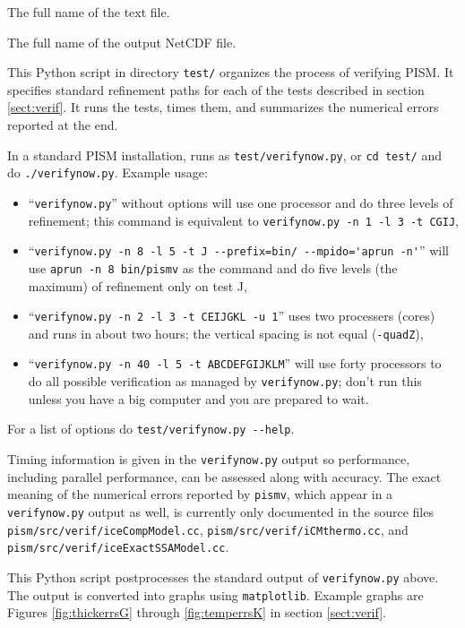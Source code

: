 \documentclass[11pt,final]{amsart}
\newcommand{\und}{\_\!\_}
\begin{document}
 The full name of the text file.

\scriptoptdef{o}{out}{series\und out.nc} The full name of the output NetCDF file.


  This Python script in directory \verb|test/| organizes the process of verifying PISM.  It specifies standard refinement paths for each of the tests described in section \ref{sect:verif}.  It runs the tests, times them, and summarizes the numerical errors reported at the end.

In a standard PISM installation, runs as \verb|test/verifynow.py|, or \verb|cd test/| and do \verb|./verifynow.py|.  Example usage: \begin{itemize}
\item ``\verb|verifynow.py|'' without options will use one processor and do three levels of refinement; this command is equivalent to \verb|verifynow.py -n 1 -l 3 -t CGIJ|,
\item ``\verb|verifynow.py -n 8 -l 5 -t J --prefix=bin/ --mpido='aprun -n'|'' will use \verb|aprun -n 8 bin/pismv| as the command and do five levels (the maximum) of refinement only on test J,
\item ``\verb|verifynow.py -n 2 -l 3 -t CEIJGKL -u 1|'' uses two processers (cores) and runs in about two hours; the vertical spacing is not equal (\verb|-quadZ|),
\item ``\verb|verifynow.py -n 40 -l 5 -t ABCDEFGIJKLM|'' will use forty processors to do all possible verification as managed by \verb|verifynow.py|; don't run this unless you have a big computer and you are prepared to wait.
\end{itemize}

For a list of options do \verb|test/verifynow.py --help|.

Timing information is given in the \verb|verifynow.py| output so performance, including parallel performance, can be assessed along with accuracy.  The exact meaning of the numerical errors reported by \verb|pismv|, which appear in a \verb|verifynow.py| output as well, is currently only documented in the source files \verb|pism/src/verif/iceCompModel.cc|, \verb|pism/src/verif/iCMthermo.cc|, and \verb|pism/src/verif/iceExactSSAModel.cc|.  


  This Python script postprocesses the standard output of \verb|verifynow.py| above.  The output is converted into graphs using \verb|matplotlib|.  Example graphs are Figures \ref{fig:thickerrsG} through \ref{fig:temperrsK} in section \ref{sect:verif}.
\end{document}
